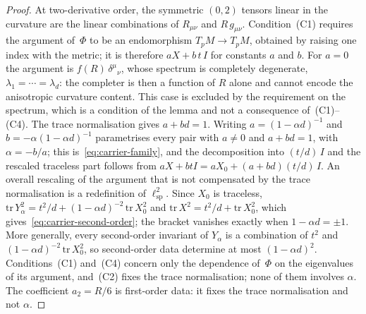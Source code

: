 \documentclass[pdflatex,sn-mathphys-num]{sn-jnl} %
\theoremstyle{remark}
\theoremstyle{plain}
\begin{document}
    \begin{proof}
      At two-derivative order, the symmetric $(0,2)$ tensors linear in the curvature are the linear combinations of
      $R_{\mu\nu}$ and $R\, g_{\mu\nu}$.
      Condition~(C1) requires the argument of~$\Phi$ to be an endomorphism $T_p M \to T_p M$, obtained by raising one
      index with the metric; it is therefore $a X + b\, t\, I$ for constants $a$ and $b$.
      For $a = 0$ the argument is $f(R)\,\delta^{\mu}{}_{\nu}$, whose spectrum is completely degenerate,
      $\lambda_1 = \cdots = \lambda_d$: the completer is then a function of $R$ alone and cannot encode the
      anisotropic curvature content.
      This case is excluded by the requirement on the spectrum, which is a condition of the lemma and not a
      consequence of~(C1)--(C4).
      The trace normalisation gives $a + b d = 1$.
      Writing $a = (1-\alpha d)^{-1}$ and $b = -\alpha (1-\alpha d)^{-1}$ parametrises every pair with $a \neq 0$
      and $a + b d = 1$, with $\alpha = -b/a$; this is~\eqref{eq:carrier-family}, and the decomposition into
      $(t/d)\,I$ and the rescaled traceless part follows from $a X + b t I = a X_0 + (a + b d)(t/d)\,I$.
      An overall rescaling of the argument that is not compensated by the trace normalisation is a redefinition of
      $\ell_{\mathrm{sp}}^{2}$.
      Since $X_0$ is traceless, $\mathrm{tr}\, Y_\alpha^{2} = t^{2}/d + (1-\alpha d)^{-2}\,\mathrm{tr}\, X_0^{2}$ and
      $\mathrm{tr}\, X^{2} = t^{2}/d + \mathrm{tr}\, X_0^{2}$, which gives~\eqref{eq:carrier-second-order}; the
      bracket vanishes exactly when $1 - \alpha d = \pm 1$.
      More generally, every second-order invariant of $Y_\alpha$ is a combination of $t^{2}$ and
      $(1-\alpha d)^{-2}\,\mathrm{tr}\,X_0^{2}$, so second-order data determine at most $(1-\alpha d)^{2}$.
      Conditions~(C1) and~(C4) concern only the dependence of~$\Phi$ on the eigenvalues of its argument, and~(C2)
      fixes the trace normalisation; none of them involves $\alpha$.
      The coefficient $a_2 = R/6$ is first-order data: it fixes the trace normalisation and not $\alpha$.
    \end{proof}
\end{document}
